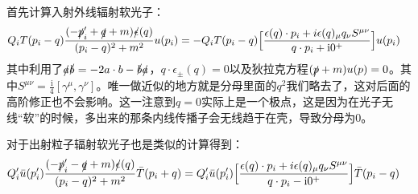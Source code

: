 首先计算入射外线辐射软光子：
\begin{equation}
	\begin{aligned}
		Q_iT(p_i-q)\frac{(-\slashed{p}_i^\prime+\slashed{q}+m)\slashed{\epsilon}(q)}{(p_i-q)^2+m^2}u(p_i)&=-Q_iT(p_i-q)\Big[\frac{\epsilon(q)\cdot p_i+i\epsilon(q)_\mu q_\nu S^{\mu\nu}}{q\cdot p_i+\mathrm{i}0^+}\Big]u(p_i)
	\end{aligned}
\end{equation}
其中利用了$\slashed{a}\slashed{b}=-2a\cdot b-\slashed{b}\slashed{a}$，$q\cdot \epsilon_\pm(q)=0$以及狄拉克方程$(\slashed{p}+m)u(p)=0$。其中$S^{\mu\nu}=\frac{\mathrm{i}}{4}[\gamma^\mu,\gamma^\nu]$。唯一做近似的地方就是分母里面的$q^2$我们略去了，这对后面的高阶修正也不会影响。这一注意到$q=0$实际上是一个极点，这是因为在光子无线“软”的时候，多出来的那条内线传播子会无线趋于在壳，导致分母为0。

对于出射粒子辐射软光子也是类似的计算得到：
\begin{equation}\label{eq:20.17}
	\begin{aligned}
		Q^\prime_i\bar u(p_i^\prime)\frac{(-\slashed{p}_i^\prime-\slashed{q}+m)\slashed{\epsilon}(q)}{(p_i-q)^2+m^2}\bar T(p_i+q)&=Q^\prime_i\bar u(p_i^\prime)\Big[\frac{\epsilon(q)\cdot p_i+i\epsilon(q)_\mu q_\nu S^{\mu\nu}}{q\cdot p_i-\mathrm{i}0^+}\Big]\bar T(p_i-q)
	\end{aligned}
\end{equation}

